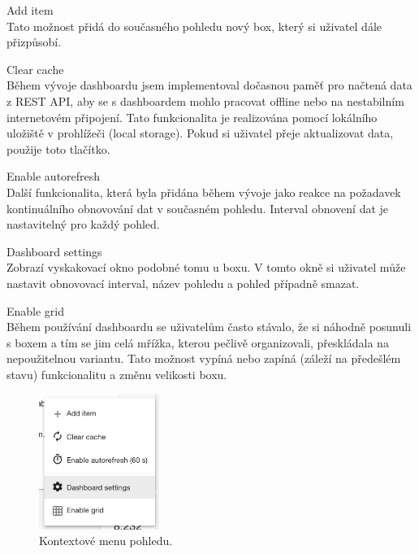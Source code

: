 \begin{description}
    \item Add item \\
        Tato možnost přidá do současného pohledu nový box, který si uživatel dále přizpůsobí.

    \item Clear cache \\
        Během vývoje dashboardu jsem implementoval dočasnou paměť pro načtená data z REST API, aby se s dashboardem mohlo pracovat offline nebo na nestabilním internetovém připojení. Tato funkcionalita je realizována pomocí lokálního uložiště v prohlížeči (local storage). Pokud si uživatel přeje aktualizovat data, použije toto tlačítko. 

    \item Enable autorefresh \\
        Další funkcionalita, která byla přidána během vývoje jako reakce na požadavek kontinuálního obnovování dat v současném pohledu. Interval obnovení dat je nastavitelný pro každý pohled.

    \item Dashboard settings \\
        Zobrazí vyskakovací okno podobné tomu u boxu. V tomto okně si uživatel může nastavit obnovovací interval, název pohledu a pohled případně smazat.
        
    \item Enable grid\\
        Během používání dashboardu se uživatelům často stávalo, že si náhodně posunuli s boxem a tím se jim celá mřížka, kterou pečlivě organizovali, přeskládala na nepoužitelnou variantu. Tato možnost vypíná nebo zapíná (záleží na předešlém stavu)  funkcionalitu a změnu velikosti boxu.
\end{description}

\begin{figure}[ht]
    \centering
    \includegraphics[width=0.35\textwidth]{fig/dashboard_menu.png}
    \caption{Kontextové menu pohledu.} \label{fig:dashboard_menu}
\end{figure}


